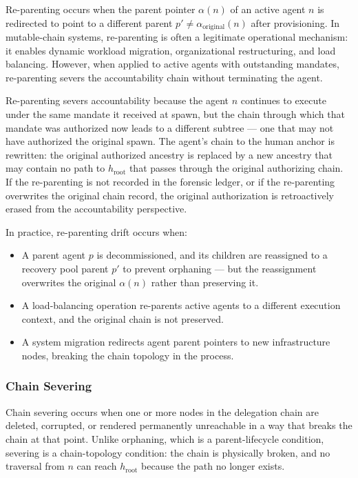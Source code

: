 Re-parenting occurs when the parent pointer $\alpha(n)$ of an active agent $n$ is redirected to point to a different parent $p' \neq \alpha_{\text{original}}(n)$ after provisioning. In mutable-chain systems, re-parenting is often a legitimate operational mechanism: it enables dynamic workload migration, organizational restructuring, and load balancing. However, when applied to active agents with outstanding mandates, re-parenting severs the accountability chain without terminating the agent.

Re-parenting severs accountability because the agent $n$ continues to execute under the same mandate it received at spawn, but the chain through which that mandate was authorized now leads to a different subtree — one that may not have authorized the original spawn. The agent's chain to the human anchor is rewritten: the original authorized ancestry is replaced by a new ancestry that may contain no path to $h_{\text{root}}$ that passes through the original authorizing chain. If the re-parenting is not recorded in the forensic ledger, or if the re-parenting overwrites the original chain record, the original authorization is retroactively erased from the accountability perspective.

In practice, re-parenting drift occurs when:
\begin{itemize}
    \item A parent agent $p$ is decommissioned, and its children are reassigned to a recovery pool parent $p'$ to prevent orphaning — but the reassignment overwrites the original $\alpha(n)$ rather than preserving it.
    \item A load-balancing operation re-parents active agents to a different execution context, and the original chain is not preserved.
    \item A system migration redirects agent parent pointers to new infrastructure nodes, breaking the chain topology in the process.
\end{itemize}

\subsubsection{Chain Severing}
\label{sec:chain-severing}

Chain severing occurs when one or more nodes in the delegation chain are deleted, corrupted, or rendered permanently unreachable in a way that breaks the chain at that point. Unlike orphaning, which is a parent-lifecycle condition, severing is a chain-topology condition: the chain is physically broken, and no traversal from $n$ can reach $h_{\text{root}}$ because the path no longer exists.

